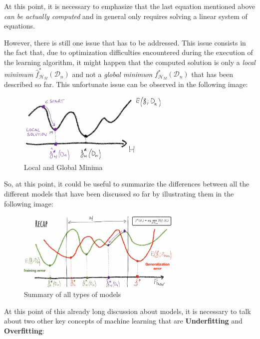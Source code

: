 At this point, it is necessary to emphasize that the last equation mentioned
above \emph{can be actually computed} and in general only requires solving
a linear system of equations.

However, there is still one issue that has to be addressed. This issue consists
in the fact that, due to optimization difficulties encountered during the
execution of the learning algorithm, it might happen that the computed solution
is only a \emph{local minimum} $\hat{f}_{\mathcal{H}_M}^*(\mathcal{D}_n)$ and not a
\emph{global minimum} $f_{\mathcal{H}_M}^*(\mathcal{D}_n)$ that has been described
so far. This unfortunate issue can be observed in the following image:

\begin{figure}[h]
      \centering
      \includegraphics[width=0.65\textwidth]{../img/Best_local_actual_model}
      \caption{Local and Global Minima}
\end{figure}

So, at this point, it could be useful to summarize the differences between
all the different models that have been discussed so far by illustrating
them in the following image:

\newpage

\begin{figure}[h]
      \centering
      \includegraphics[width=0.7\textwidth]{../img/Recap_models}
      \caption{Summary of all types of models}
\end{figure}

At this point of this already long discussion about models, it is necessary to
talk about two other key concepts of machine learning that are \textbf{Underfitting}
and \textbf{Overfitting}:

